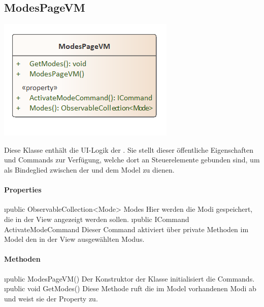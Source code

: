 \documentclass[../entwurf.tex]{subfiles}
\begin{document}
\subsection{ModesPageVM}
\begin{minipage}{0.5\textwidth}
\includegraphics[scale=0.75]{../graphics/vm_klassen/ModesPageVM.png}
\end{minipage}
\begin{minipage}{0.5\textwidth}
 \newline
Diese Klasse enthält die UI-Logik der . Sie stellt dieser öffentliche Eigenschaften und Commands zur Verfügung, welche dort an Steuerelemente gebunden sind, um als Bindeglied zwischen der  und dem Model zu dienen.
\end{minipage}
\paragraph{Properties}
\begin{itemize}
	\i{public ObservableCollection<Mode> Modes} Hier werden die Modi gespeichert, die in der View angezeigt werden sollen.
	\i{public ICommand ActivateModeCommand} Dieser Command aktiviert über private Methoden im Model den in der View ausgewählten Modus. 
\end{itemize}
\paragraph{Methoden}
\begin{itemize}
	\i{public ModesPageVM()} Der Konstruktor der Klasse initialisiert die Commands.
	\i{public void GetModes()} Diese Methode ruft die im Model vorhandenen Modi ab und weist sie der Property  zu.
\end{itemize}
\end{document}
